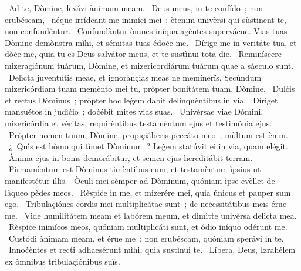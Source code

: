 \psalmChapterWithInscription{}
{ }
{%
~Ad te, Dòmine, levávi ànimam meam. 
~Deus meus, in te confído~; non erubéscam, 
~néque irrídeant me inimíci mei~; ètenim univèrsi qui sùstinent te, non confundèntur. 
~Confundàntur òmnes iníqua agèntes supervácue. Vias tuas Dòmine demònstra mìhi, et sémitas tuas édoċe me. 
~Dírige me in veritáte tua, et dòċe me, quia tu es Deus salvátor meus, et te sustìnui tota die. 
~Reminíscere mizeraçiónum tuárum, Dòmine, et mizericordiárum tuárum quae a sáeculo sunt. 
~Delìcta juventútis meae, et ignorànçias meas ne memínerïs. Secùndum mizericórdiam tuam memènto mei tu, pròpter bonitátem tuam, Dòmine. 
~Dulċis et rectus Dòminus~; pròpter hoc leġem dabit delinquèntibus in via. 
~Díriget mansuétos in judìċio~; doċébit mites vias suas. 
~Univèrsae viae Dòmini, mizericórdia et vèritas, requirèntibus testamèntum ejus et testimónia ejus. 
~Pròpter nomen tuum, Dòmine, propiçiáberis peccáto meo~; mùltum est ènim. 
~¿~Quìs est hòmo qui tìmet Dòminum~? Leġem statúvit ei in via, quam elégit. 
~Ànima ejus in bonïs demorábitur, et semen ejus hereditábit terram. 
~Firmamèntum est Dòminus timèntibus eum, et testamèntum ìpsius ut manifestétur illïs. 
~Òculi mei sèmper ad Dòminum, quóniam ìpse evèllet de làqueo pèdes meos. 
~Rèspiċe in me, et mizerére mei, quia únicus et pauper sum ego. 
~Tribulaçiónes cordis mei multiplicátae sunt~; de neċessitátibus meïs érue me. 
~Vìde humilitátem meam et labórem meum, et dimìtte univèrsa delìcta mea. 
~Rèspiċe inimícos meos, quóniam multiplicáti sunt, et ódio iníquo odérunt me. 
~Custódi ànimam meam, et érue me~; non erubéscam, quóniam sperávi in te. 
~Innoċèntes et recti adhaesérunt mìhi, quia sustìnui te. 
~Líbera, Deus, Izrahélem ex òmnibus tribulaçiónibus suïs. 
}
